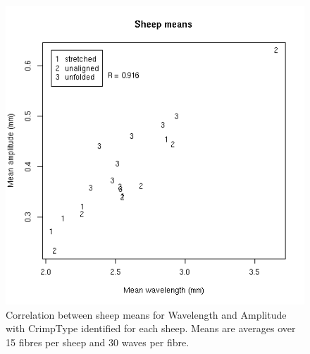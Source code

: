 %

\begin{figure}[!h]
  \centering
  \includegraphics[width=1.0\textwidth]{figsfsheepmeans.png}
  \caption{Correlation between sheep means for Wavelength and Amplitude with CrimpType identified for each sheep. Means are averages over 15 fibres per sheep and 30 waves per fibre.}
  \label{fig:sfsheepmeans}
\end{figure}

%

